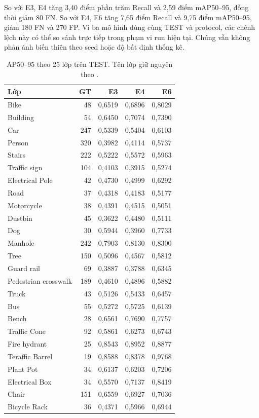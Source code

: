 \documentclass[10pt,a4paper,twocolumn]{article}
\begin{document}
So với E3, E4 tăng 3,40 điểm phần trăm Recall và 2,59 điểm mAP50--95, đồng thời giảm 80 FN. So với E4, E6 tăng 7,65 điểm Recall và 9,75 điểm mAP50--95, giảm 180 FN và 270 FP. Vì ba mô hình dùng cùng TEST và protocol, các chênh lệch này có thể so sánh trực tiếp trong phạm vi run hiện tại. Chúng vẫn không phản ánh biến thiên theo seed hoặc độ bất định thống kê.

\begin{table}[ht]
\centering\scriptsize
\caption{AP50--95 theo 25 lớp trên TEST. Tên lớp giữ nguyên theo .}\label{tab:test_class}
\begin{tabular}{lrrrr}\toprule
Lớp & GT & E3 & E4 & E6\\\midrule
Bike & 48 & 0,6519 & 0,6896 & 0,8029\\
Building & 54 & 0,6450 & 0,7074 & 0,7390\\
Car & 247 & 0,5339 & 0,5404 & 0,6103\\
Person & 320 & 0,3982 & 0,4114 & 0,5737\\
Stairs & 222 & 0,5222 & 0,5572 & 0,5963\\
Traffic sign & 104 & 0,4103 & 0,3915 & 0,5274\\
Electrical Pole & 42 & 0,4730 & 0,4999 & 0,6292\\
Road & 37 & 0,4318 & 0,4183 & 0,5177\\
Motorcycle & 38 & 0,4391 & 0,4515 & 0,5051\\
Dustbin & 45 & 0,3622 & 0,4480 & 0,5111\\
Dog & 30 & 0,5944 & 0,3960 & 0,7733\\
Manhole & 242 & 0,7903 & 0,8130 & 0,8300\\
Tree & 150 & 0,5096 & 0,4567 & 0,5812\\
Guard rail & 69 & 0,3887 & 0,3788 & 0,6345\\
Pedestrian crosswalk & 189 & 0,4610 & 0,4896 & 0,5882\\
Truck & 43 & 0,5126 & 0,5433 & 0,6457\\
Bus & 55 & 0,5272 & 0,5725 & 0,6139\\
Bench & 28 & 0,6561 & 0,7690 & 0,7757\\
Traffic Cone & 92 & 0,5861 & 0,6273 & 0,6743\\
Fire hydrant & 25 & 0,8543 & 0,8952 & 0,8877\\
Teraffic Barrel & 19 & 0,8588 & 0,8378 & 0,9768\\
Plant Pot & 34 & 0,6137 & 0,6203 & 0,7206\\
Electrical Box & 34 & 0,5570 & 0,7137 & 0,8419\\
Chair & 151 & 0,6559 & 0,6927 & 0,7036\\
Bicycle Rack & 36 & 0,4371 & 0,5966 & 0,6944\\\bottomrule
\end{tabular}
\end{table}
\end{document}
